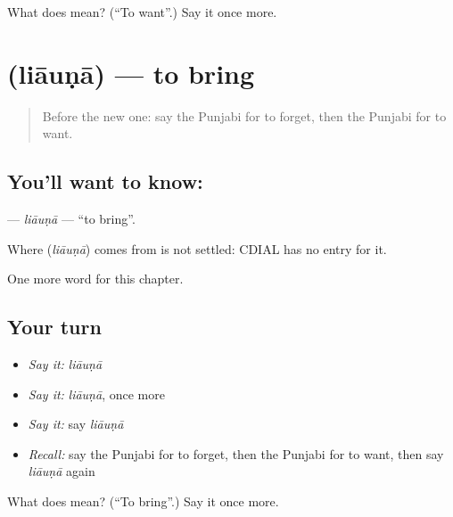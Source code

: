 \begin{tcolorbox}[breakable,colback=teal!4,colframe=teal!35!black,title={Before you move on}]
What does  mean? (\textquotedblleft{}To want\textquotedblright{}.) Say it once more.
\end{tcolorbox}
\section[\texorpdfstring{\pa{ਲਿਆਉਣਾ} (liāuṇā)}{ਲਿਆਉਣਾ (liāuṇā)}]{ (liāuṇā) — to bring}

\label{lesson:PA-C60-liauna}



\begin{quote}
Before the new one: say the Punjabi for to forget, then the Punjabi for to want.
\end{quote}

\subsection*{You'll want to know: }
\textbf{} — \emph{liāuṇā} — \textquotedblleft{}to bring\textquotedblright{}.

\begin{cousinweb}
Where \textbf{} (\emph{liāuṇā}) comes from is not settled: CDIAL has no entry for it.
\end{cousinweb}

\begin{grammarlens}[title={What you've built}]
One more word for this chapter.
\end{grammarlens}

\subsection*{Your turn}
\begin{itemize}
\raggedright
  \item \emph{Say it:} \emph{liāuṇā}
  \item \emph{Say it:} \emph{liāuṇā}, once more
  \item \emph{Say it:} say \emph{liāuṇā}
  \item \emph{Recall:} say the Punjabi for to forget, then the Punjabi for to want, then say \emph{liāuṇā} again
\end{itemize}

\begin{tcolorbox}[breakable,colback=teal!4,colframe=teal!35!black,title={Before you move on}]
What does  mean? (\textquotedblleft{}To bring\textquotedblright{}.) Say it once more.
\end{tcolorbox}
